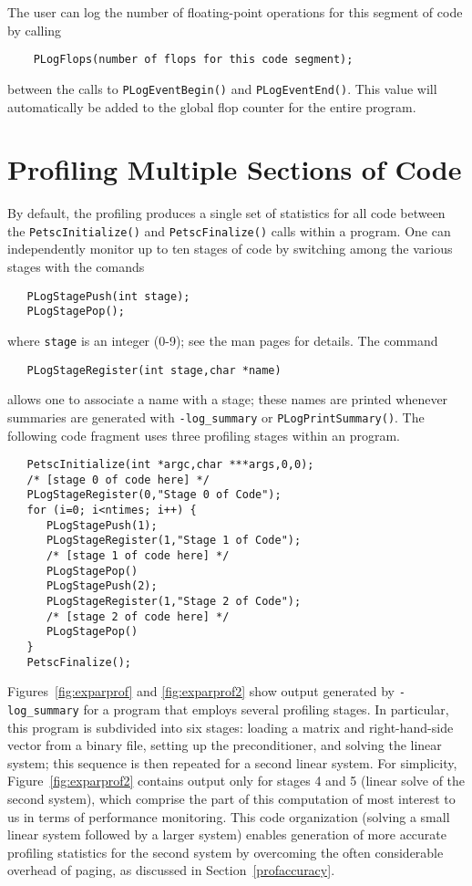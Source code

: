 The user can log the number of floating-point operations 
for this segment of code by calling 
\begin{verbatim}
    PLogFlops(number of flops for this code segment);
\end{verbatim}
between the calls to {\tt PLogEventBegin()} and {\tt PLogEventEnd()}.
This value will automatically be added to the global flop counter for the
entire program.

\section{Profiling Multiple Sections of Code}
\label{sec:profstages}

By default, the profiling produces a single set of statistics for all
code between the {\tt PetscInitialize()} and {\tt PetscFinalize()}
calls within a program.  One can independently monitor up to ten
stages of code by switching among the various stages with the comands
 
\begin{verbatim}
   PLogStagePush(int stage);
   PLogStagePop();
\end{verbatim}
where {\tt stage} is an integer (0-9); see the man pages for details.
The command  
\begin{verbatim}
   PLogStageRegister(int stage,char *name)
\end{verbatim}
allows one to associate a name with a stage; these names are printed whenever
summaries are generated with {\tt -log\_summary} or {\tt PLogPrintSummary()}.
The following code fragment uses three profiling stages within an program.

\begin{verbatim}
   PetscInitialize(int *argc,char ***args,0,0);
   /* [stage 0 of code here] */
   PLogStageRegister(0,"Stage 0 of Code");
   for (i=0; i<ntimes; i++) {
      PLogStagePush(1);
      PLogStageRegister(1,"Stage 1 of Code");
      /* [stage 1 of code here] */
      PLogStagePop()
      PLogStagePush(2);
      PLogStageRegister(1,"Stage 2 of Code");
      /* [stage 2 of code here] */
      PLogStagePop()
   }
   PetscFinalize();
\end{verbatim}

Figures~\ref{fig:exparprof} and \ref{fig:exparprof2} show output
generated by {\tt -log\_summary} for a program that employs
several profiling stages.  In particular, this program is
subdivided into six stages: loading a matrix and right-hand-side
vector from a binary file, setting up the preconditioner, and solving
the linear system; this sequence is then repeated for a second linear
system.  For simplicity, Figure~\ref{fig:exparprof2} contains output
only for stages 4 and 5 (linear solve of the second system), which comprise
the part of this computation of most interest to us in terms of
performance monitoring.  This code organization (solving a small
linear system followed by a larger system) enables generation of more
accurate profiling statistics for the second system by overcoming the
often considerable overhead of paging, as discussed in
Section~\ref{profaccuracy}.

